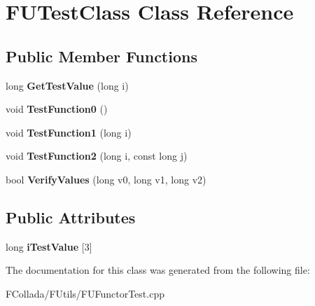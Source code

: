 \hypertarget{classFUTestClass}{
\section{FUTestClass Class Reference}
\label{classFUTestClass}
}
\subsection*{Public Member Functions}
\begin{DoxyCompactItemize}
\item 
\hypertarget{classFUTestClass_a8782cc7d6fdd0481b7632d64c572fd43}{
long {\bfseries GetTestValue} (long i)}
\label{classFUTestClass_a8782cc7d6fdd0481b7632d64c572fd43}

\item 
\hypertarget{classFUTestClass_a692e66e2e6506d817fe8b7324c623ecf}{
void {\bfseries TestFunction0} ()}
\label{classFUTestClass_a692e66e2e6506d817fe8b7324c623ecf}

\item 
\hypertarget{classFUTestClass_a3cea0b18c141e64f1c865194341fa0e2}{
void {\bfseries TestFunction1} (long i)}
\label{classFUTestClass_a3cea0b18c141e64f1c865194341fa0e2}

\item 
\hypertarget{classFUTestClass_adc73bc680f9bd7407ea4a06febde9992}{
void {\bfseries TestFunction2} (long i, const long j)}
\label{classFUTestClass_adc73bc680f9bd7407ea4a06febde9992}

\item 
\hypertarget{classFUTestClass_a68de0be64e8ded9ac2779a5181b0467e}{
bool {\bfseries VerifyValues} (long v0, long v1, long v2)}
\label{classFUTestClass_a68de0be64e8ded9ac2779a5181b0467e}

\end{DoxyCompactItemize}
\subsection*{Public Attributes}
\begin{DoxyCompactItemize}
\item 
\hypertarget{classFUTestClass_a2b41d6a0b4fec2ed2049b9c21231a5ac}{
long {\bfseries iTestValue} \mbox{[}3\mbox{]}}
\label{classFUTestClass_a2b41d6a0b4fec2ed2049b9c21231a5ac}

\end{DoxyCompactItemize}


The documentation for this class was generated from the following file:\begin{DoxyCompactItemize}
\item 
FCollada/FUtils/FUFunctorTest.cpp\end{DoxyCompactItemize}
